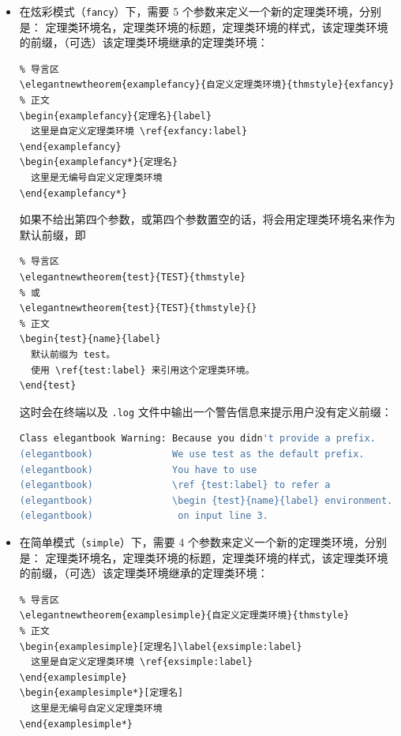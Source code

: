 \documentclass[lang=cn,10pt,scheme=chinese]{boyogalaelegantbook}
\begin{document}
\begin{itemize}
  \item 在炫彩模式（\lstinline{fancy}）下，需要 5 个参数来定义一个新的定理类环境，分别是：
  定理类环境名，定理类环境的标题，定理类环境的样式，该定理类环境的前缀，（可选）该定理类环境继承的定理类环境：

\begin{lstlisting}
% 导言区
\elegantnewtheorem{examplefancy}{自定义定理类环境}{thmstyle}{exfancy}
% 正文
\begin{examplefancy}{定理名}{label}
  这里是自定义定理类环境 \ref{exfancy:label}
\end{examplefancy}
\begin{examplefancy*}{定理名}
  这里是无编号自定义定理类环境
\end{examplefancy*}
\end{lstlisting}

  如果不给出第四个参数，或第四个参数置空的话，将会用定理类环境名来作为默认前缀，即
\begin{lstlisting}
% 导言区
\elegantnewtheorem{test}{TEST}{thmstyle}
% 或
\elegantnewtheorem{test}{TEST}{thmstyle}{}
% 正文
\begin{test}{name}{label}
  默认前缀为 test。
  使用 \ref{test:label} 来引用这个定理类环境。
\end{test}
\end{lstlisting}

这时会在终端以及 \verb|.log| 文件中输出一个警告信息来提示用户没有定义前缀：

\begin{lstlisting}[language=bash]
Class elegantbook Warning: Because you didn't provide a prefix. 
(elegantbook)              We use test as the default prefix. 
(elegantbook)              You have to use 
(elegantbook)              \ref {test:label} to refer a 
(elegantbook)              \begin {test}{name}{label} environment. 
(elegantbook)               on input line 3.
\end{lstlisting}

  \item 在简单模式（\lstinline{simple}）下，需要 4 个参数来定义一个新的定理类环境，分别是：
  定理类环境名，定理类环境的标题，定理类环境的样式，该定理类环境的前缀，（可选）该定理类环境继承的定理类环境：
\begin{lstlisting}
% 导言区
\elegantnewtheorem{examplesimple}{自定义定理类环境}{thmstyle}
% 正文
\begin{examplesimple}[定理名]\label{exsimple:label}
  这里是自定义定理类环境 \ref{exsimple:label}
\end{examplesimple}
\begin{examplesimple*}[定理名]
  这里是无编号自定义定理类环境
\end{examplesimple*}
\end{lstlisting}


\end{itemize}
\end{document}
